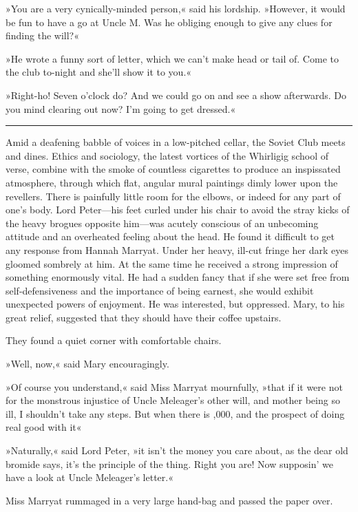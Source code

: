 »You are a very cynically-minded person,« said his lordship. »However, it would be fun to have a go at Uncle M. Was he obliging enough to give any clues for finding the will?«

»He wrote a funny sort of letter, which we can't make head or tail of. Come to the club to-night and she'll show it to you.«

»Right-ho! Seven o'clock do? And we could go on and see a show afterwards. Do you mind clearing out now? I'm going to get dressed.«

\noindent\hfil\rule{0.5\textwidth}{.4pt}\hfil 

Amid a deafening babble of voices in a low-pitched cellar, the Soviet Club meets and dines. Ethics and sociology, the latest vortices of the Whirligig school of verse, combine with the smoke of countless cigarettes to produce an inspissated atmosphere, through which flat, angular mural paintings dimly lower upon the revellers. There is painfully little room for the elbows, or indeed for any part of one's body. Lord Peter—his feet curled under his chair to avoid the stray kicks of the heavy brogues opposite him—was acutely conscious of an unbecoming attitude and an overheated feeling about the head. He found it difficult to get any response from Hannah Marryat. Under her heavy, ill-cut fringe her dark eyes gloomed sombrely at him. At the same time he received a strong impression of something enormously vital. He had a sudden fancy that if she were set free from self-defensiveness and the importance of being earnest, she would exhibit unexpected powers of enjoyment. He was interested, but oppressed. Mary, to his great relief, suggested that they should have their coffee upstairs.

They found a quiet corner with comfortable chairs.

»Well, now,« said Mary encouragingly.

»Of course you understand,« said Miss Marryat mournfully, »that if it were not for the monstrous injustice of Uncle Meleager's other will, and mother being so ill, I shouldn't take any steps. But when there is ,000, and the prospect of doing real good with it\longdash«

»Naturally,« said Lord Peter, »it isn't the money you care about, as the dear old bromide says, it's the principle of the thing. Right you are! Now supposin' we have a look at Uncle Meleager's letter.«

Miss Marryat rummaged in a very large hand-bag and passed the paper over.

